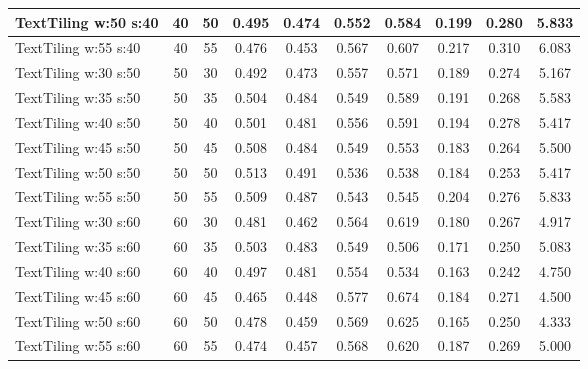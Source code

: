 \documentclass{article}
\begin{document}
\begin{longtable}[c]{|l|c|c|c|c|c|c|c|c|c|}
 TextTiling w:50 s:40 & 40 & 50 & 0.495 & 0.474 & 0.552 & 0.584 & 0.199 & 0.280 & 5.833  \\ \hline 
 TextTiling w:55 s:40 & 40 & 55 & 0.476 & 0.453 & 0.567 & 0.607 & 0.217 & 0.310 & 6.083  \\ \hline 
 TextTiling w:30 s:50 & 50 & 30 & 0.492 & 0.473 & 0.557 & 0.571 & 0.189 & 0.274 & 5.167  \\ \hline 
 TextTiling w:35 s:50 & 50 & 35 & 0.504 & 0.484 & 0.549 & 0.589 & 0.191 & 0.268 & 5.583  \\ \hline 
 TextTiling w:40 s:50 & 50 & 40 & 0.501 & 0.481 & 0.556 & 0.591 & 0.194 & 0.278 & 5.417  \\ \hline 
 TextTiling w:45 s:50 & 50 & 45 & 0.508 & 0.484 & 0.549 & 0.553 & 0.183 & 0.264 & 5.500  \\ \hline 
 TextTiling w:50 s:50 & 50 & 50 & 0.513 & 0.491 & 0.536 & 0.538 & 0.184 & 0.253 & 5.417  \\ \hline 
 TextTiling w:55 s:50 & 50 & 55 & 0.509 & 0.487 & 0.543 & 0.545 & 0.204 & 0.276 & 5.833  \\ \hline 
 TextTiling w:30 s:60 & 60 & 30 & 0.481 & 0.462 & 0.564 & 0.619 & 0.180 & 0.267 & 4.917  \\ \hline 
 TextTiling w:35 s:60 & 60 & 35 & 0.503 & 0.483 & 0.549 & 0.506 & 0.171 & 0.250 & 5.083  \\ \hline 
 TextTiling w:40 s:60 & 60 & 40 & 0.497 & 0.481 & 0.554 & 0.534 & 0.163 & 0.242 & 4.750  \\ \hline 
 TextTiling w:45 s:60 & 60 & 45 & 0.465 & 0.448 & 0.577 & 0.674 & 0.184 & 0.271 & 4.500  \\ \hline 
 TextTiling w:50 s:60 & 60 & 50 & 0.478 & 0.459 & 0.569 & 0.625 & 0.165 & 0.250 & 4.333  \\ \hline 
 TextTiling w:55 s:60 & 60 & 55 & 0.474 & 0.457 & 0.568 & 0.620 & 0.187 & 0.269 & 5.000  \\ \hline 
 \end{longtable} 
\newpage
\end{document}
